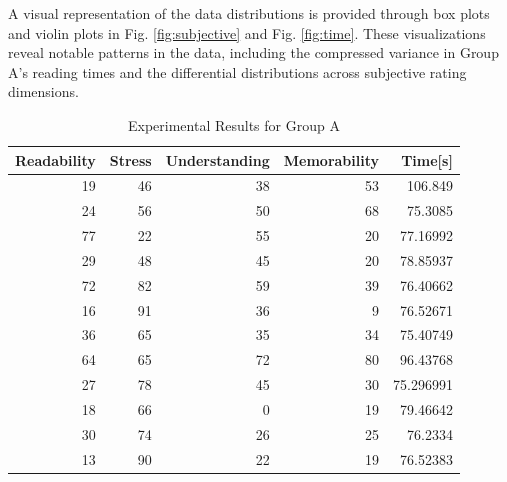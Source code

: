 \documentclass[authoryear]{elsarticle}
\begin{document}
A visual representation of the data distributions is provided through box plots and violin plots in Fig. \ref{fig:subjective} and Fig. \ref{fig:time}. These visualizations reveal notable patterns in the data, including the compressed variance in Group A’s reading times and the differential distributions across subjective rating dimensions.

\begin{table}[htbp]
  \centering
  \caption{Experimental Results for Group A}
  \label{tab:data_a}
  \begin{tabular}{rrrrr}
    \toprule
    Readability & Stress & Understanding & Memorability & Time[s]   \\
    \midrule
    19          & 46     & 38            & 53           & 106.849   \\
    24          & 56     & 50            & 68           & 75.3085   \\
    77          & 22     & 55            & 20           & 77.16992  \\
    29          & 48     & 45            & 20           & 78.85937  \\
    72          & 82     & 59            & 39           & 76.40662  \\
    16          & 91     & 36            & 9            & 76.52671  \\
    36          & 65     & 35            & 34           & 75.40749  \\
    64          & 65     & 72            & 80           & 96.43768  \\
    27          & 78     & 45            & 30           & 75.296991 \\
    18          & 66     & 0             & 19           & 79.46642  \\
    30          & 74     & 26            & 25           & 76.2334   \\
    13          & 90     & 22            & 19           & 76.52383  \\
    \bottomrule
  \end{tabular}
\end{table}
\end{document}
